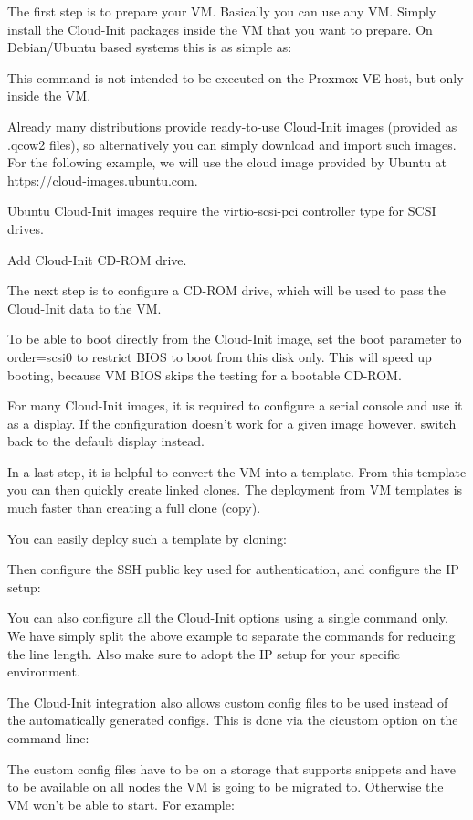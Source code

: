 The first step is to prepare your VM. Basically you can use any VM. Simply install the Cloud-Init packages inside the VM that you want to prepare. On Debian/Ubuntu based systems this is as simple as:

This command is not intended to be executed on the Proxmox VE host, but only inside the VM.

Already many distributions provide ready-to-use Cloud-Init images (provided as .qcow2 files), so alternatively you can simply download and import such images. For the following example, we will use the cloud image provided by Ubuntu at https://cloud-images.ubuntu.com.

Ubuntu Cloud-Init images require the virtio-scsi-pci controller type for SCSI drives.

Add Cloud-Init CD-ROM drive.

The next step is to configure a CD-ROM drive, which will be used to pass the Cloud-Init data to the VM.

To be able to boot directly from the Cloud-Init image, set the boot parameter to order=scsi0 to restrict BIOS to boot from this disk only. This will speed up booting, because VM BIOS skips the testing for a bootable CD-ROM.

For many Cloud-Init images, it is required to configure a serial console and use it as a display. If the configuration doesn’t work for a given image however, switch back to the default display instead.

In a last step, it is helpful to convert the VM into a template. From this template you can then quickly create linked clones. The deployment from VM templates is much faster than creating a full clone (copy).

You can easily deploy such a template by cloning:

Then configure the SSH public key used for authentication, and configure the IP setup:

You can also configure all the Cloud-Init options using a single command only. We have simply split the above example to separate the commands for reducing the line length. Also make sure to adopt the IP setup for your specific environment.

The Cloud-Init integration also allows custom config files to be used instead of the automatically generated configs. This is done via the cicustom option on the command line:

The custom config files have to be on a storage that supports snippets and have to be available on all nodes the VM is going to be migrated to. Otherwise the VM won’t be able to start. For example:

